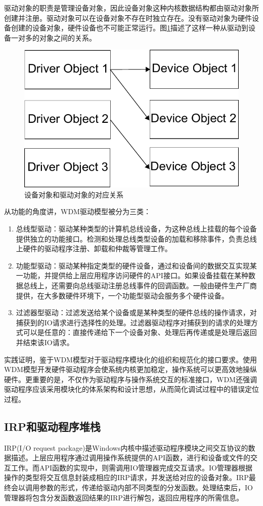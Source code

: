 驱动对象的职责是管理设备对象，因此设备对象这种内核数据结构都由驱动对象所创建并注册。驱动对象可以在设备对象不存在时独立存在。没有驱动对象为硬件设备创建的设备对象，硬件设备也不可能正常运行。图\ref{fig:drv-to-dev}描述了这样一种从驱动到设备一对多的对象之间的关系。
\begin{figure}[!htb]
\centering
\includegraphics[width=0.6\linewidth]{./graph/drv-to-dev}
\caption{设备对象和驱动对象的对应关系}
\label{fig:drv-to-dev}
\end{figure}

从功能的角度讲，WDM驱动模型被分为三类：
\begin{enumerate}
\item
总线型驱动：驱动某种类型的计算机总线设备，为这种总线上挂载的每个设备提供独立的功能接口。检测和处理总线类型设备的加载和移除事件，负责总线上硬件的驱动程序注册、卸载和仲裁等管理工作。
\item
功能型驱动：驱动某种指定类型的硬件设备，通过和设备间的数据交互实现某一功能，并提供给上层应用程序访问硬件的API接口。如果设备挂载在某种数据总线上，还需要向总线驱动注册总线事件的回调函数。一般由硬件生产厂商提供，在大多数硬件环境下，一个功能型驱动会服务多个硬件设备。
\item
过滤器型驱动：过滤发送给某个设备或是某种类型的硬件总线的操作请求，对捕获到的IO请求进行选择性的处理。过滤器驱动程序对捕获到的请求的处理方式可以是任意的：直接传递给下一个设备对象、处理后再传递或是处理后返回并结束该IO请求。
\end{enumerate}

实践证明，鉴于WDM模型对于驱动程序模块化的组织和规范化的接口要求。使用WDM模型开发硬件驱动程序会使系统内核更加稳定，操作系统可以更高效地操纵硬件。更重要的是，不仅作为驱动程序与操作系统交互的标准接口，WDM还强调驱动程序应该采用模块化的体系架构和设计思想，从而简化调试过程中的错误定位过程。

\subsection{IRP和驱动程序堆栈}
IRP(I/O request package)是Windows内核中描述驱动程序模块之间交互协议的数据描述。上层应用程序通过调用操作系统提供的API函数，进行和设备或文件的交互工作。而API函数的实现中，则需调用IO管理器完成交互请求。IO管理器根据操作的类型将交互信息封装成相应的IRP请求，并发送给对应的设备对象。IRP最终会以调用参数的形式，传递给驱动内部不同类型的分发函数。处理结束后，IO管理器将包含分发函数返回结果的IRP进行解包，返回应用程序的所需信息。

